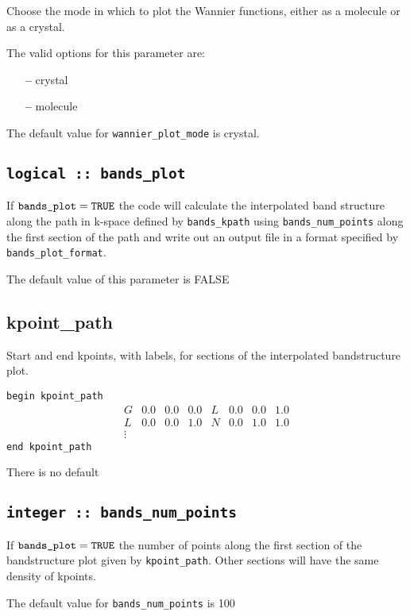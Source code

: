 Choose the mode in which to plot the Wannier functions, either as a molecule
or as a crystal.

The valid options for this parameter are:
\begin{itemize}
\item[{\bf --}] crystal 
\item[{\bf --}] molecule 
\end{itemize}

The default value for \verb#wannier_plot_mode# is crystal.


\subsection[bands\_plot]{\tt logical :: bands\_plot}

If $\verb#bands_plot#=\verb#TRUE#$ the code will calculate the interpolated band structure along
the path in k-space defined by \verb#bands_kpath# using \verb#bands_num_points# along the first
section of the path and write out an output file in a format specified
by \verb#bands_plot_format#. 

The default value of this parameter is FALSE


\subsection[kpoint\_path]{kpoint\_path}
Start and end kpoints, with labels, for sections of the interpolated
bandstructure plot.

\noindent  \verb#begin kpoint_path#
$$
\begin{array}{cccccccc}
G & 0.0 & 0.0 & 0.0 & L & 0.0 & 0.0 & 1.0 \\
L & 0.0 & 0.0 & 1.0 & N & 0.0 & 1.0 & 1.0 \\
\vdots
\end{array}
$$
\verb#end kpoint_path#

There is no default

\subsection[bands\_num\_points]{\tt integer :: bands\_num\_points}

If $\verb#bands_plot#=\verb#TRUE#$ the number of points along the first
section of the bandstructure plot given by \verb#kpoint_path#. Other
sections will have the same density of kpoints.

The default value for \verb#bands_num_points# is 100


